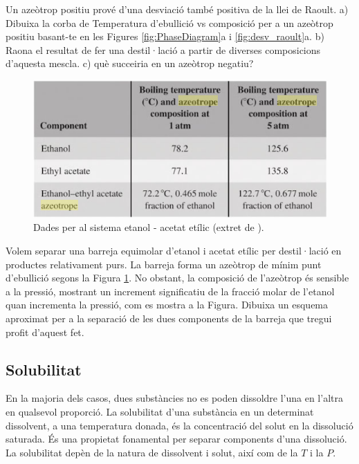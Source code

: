 \begin{exr}
Un azeòtrop positiu prové d'una desviació també positiva de la llei de Raoult. a) Dibuixa la corba de Temperatura d'ebullició vs composició per a un azeòtrop positiu basant-te en les Figures \ref{fig:PhaseDiagram}a i \ref{fig:desv_raoult}a. b) Raona el resultat de fer una destil·lació a partir de diverses composicions d'aquesta mescla. c) què succeiria en un azeòtrop negatiu?
\end{exr}
\begin{figure}[h]
\centering
\includegraphics[scale=1.0]{figures/AzeotropEX.png}
\caption{Dades per al sistema etanol - acetat etílic (extret de \cite{Robin2016}).}
\label{fig:AzeotropEX}
\end{figure}
\begin{exr}
Volem separar una barreja equimolar d'etanol i acetat etílic per destil·lació en productes relativament purs. La barreja forma un azeòtrop de mínim punt d'ebullició segons la Figura \ref{fig:AzeotropEX}. No obstant, la composició de l'azeòtrop és sensible a la pressió, mostrant un increment significatiu de la fracció molar de l'etanol quan incrementa la pressió, com es mostra a la Figura. Dibuixa un esquema aproximat per a la separació de les dues components de la barreja que tregui profit d'aquest fet.
\end{exr}

\subsection{Solubilitat}

En la majoria dels casos, dues substàncies no es poden dissoldre l'una en l'altra en qualsevol proporció.
La solubilitat d'una substància en un determinat dissolvent, a una temperatura donada, és la concentració del solut en la dissolució saturada.
És una propietat fonamental per separar components d'una dissolució.
La solubilitat depèn de la natura de dissolvent i solut, així com de la $T$ i la $P$.

